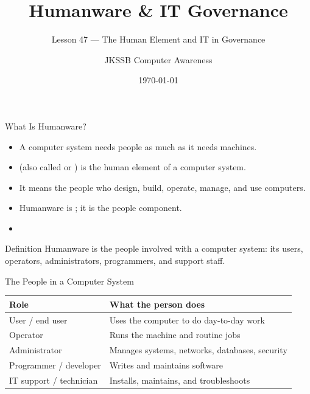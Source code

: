 \documentclass[aspectratio=169]{beamer}
\title{Humanware \& IT Governance}
\subtitle{Lesson 47 --- The Human Element and IT in Governance}
\author{JKSSB Computer Awareness}
\date{\today}
\begin{document}
\frame{\titlepage}

\begin{frame}{What Is Humanware?}
  \begin{itemize}
    \item A computer system needs people as much as it needs machines.
    \item {} (also called  or ) is
      the human element of a computer system.
    \item It means the people who design, build, operate, manage, and use
      computers.
    \item Humanware is ; it is the people
      component.
    \item {}
  \end{itemize}
  \begin{block}{Definition}
    Humanware is the people involved with a computer system: its users,
    operators, administrators, programmers, and support staff.
  \end{block}
\end{frame}

\begin{frame}{The People in a Computer System}
  \begin{center}
    \begin{tabular}{p{}p{}}
      \toprule
      \textbf{Role} & \textbf{What the person does} \\
      \midrule
      User / end user & Uses the computer to do day-to-day work \\
      Operator & Runs the machine and routine jobs \\
      Administrator & Manages systems, networks, databases, security \\
      Programmer / developer & Writes and maintains software \\
      IT support / technician & Installs, maintains, and troubleshoots \\
      \bottomrule
    \end{tabular}
  \end{center}
  \vspace{0.2cm}
\end{frame}
\end{document}
